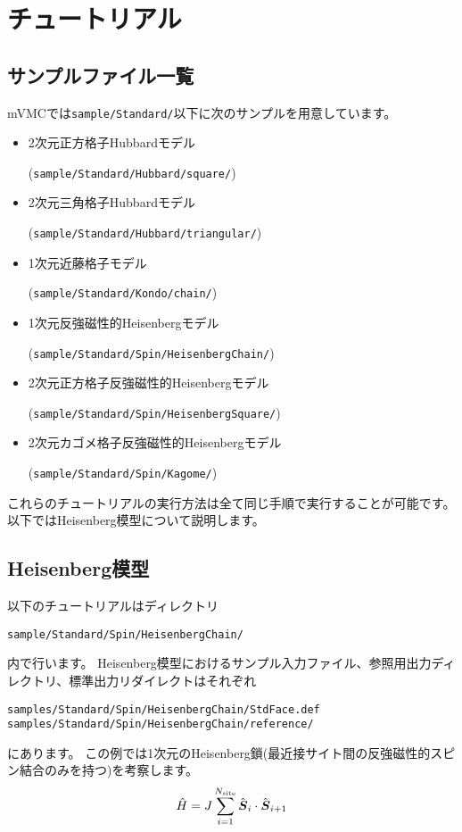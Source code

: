 \chapter{チュートリアル}
\label{Ch:model}

\section{サンプルファイル一覧}

mVMCでは\verb|sample/Standard/|以下に次のサンプルを用意しています。

\begin{itemize}
\item 2次元正方格子Hubbardモデル

  (\verb|sample/Standard/Hubbard/square/|)
\item 2次元三角格子Hubbardモデル

  (\verb|sample/Standard/Hubbard/triangular/|)
\item 1次元近藤格子モデル

  (\verb|sample/Standard/Kondo/chain/|)
\item 1次元反強磁性的Heisenbergモデル

  (\verb|sample/Standard/Spin/HeisenbergChain/|)
\item 2次元正方格子反強磁性的Heisenbergモデル

  (\verb|sample/Standard/Spin/HeisenbergSquare/|)
  
\item 2次元カゴメ格子反強磁性的Heisenbergモデル

  (\verb|sample/Standard/Spin/Kagome/|)

\end{itemize}

これらのチュートリアルの実行方法は全て同じ手順で実行することが可能です。
以下ではHeisenberg模型について説明します。


\section{Heisenberg模型}

以下のチュートリアルはディレクトリ
\begin{verbatim}
sample/Standard/Spin/HeisenbergChain/
\end{verbatim}
内で行います。
Heisenberg模型におけるサンプル入力ファイル、参照用出力ディレクトリ、標準出力リダイレクトはそれぞれ
\begin{verbatim}
samples/Standard/Spin/HeisenbergChain/StdFace.def
samples/Standard/Spin/HeisenbergChain/reference/
\end{verbatim}
にあります。
この例では1次元のHeisenberg鎖(最近接サイト間の反強磁性的スピン結合のみを持つ)を考察します。
\begin{align}
  {\hat H} = J \sum_{i=1}^{N_{\rm site}} {\hat {\boldsymbol S}}_i \cdot {\hat {\boldsymbol S}}_{i+1}
\end{align}

